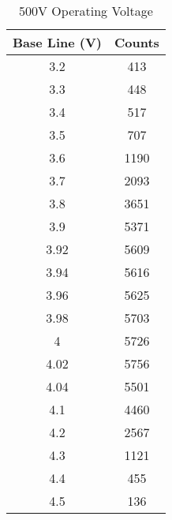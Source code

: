 \begin{table}[]
	\centering
	\begin{tabular}{|c|c|}
	\hline
	\textbf{Base Line (V)} & \textbf{Counts} \\ \hline
	3.2  & 413  \\ \hline
	3.3  & 448  \\ \hline
	3.4  & 517  \\ \hline
	3.5  & 707  \\ \hline
	3.6  & 1190 \\ \hline
	3.7  & 2093 \\ \hline
	3.8  & 3651 \\ \hline
	3.9  & 5371 \\ \hline
	3.92 & 5609 \\ \hline
	3.94 & 5616 \\ \hline
	3.96 & 5625 \\ \hline
	3.98 & 5703 \\ \hline
	4    & 5726 \\ \hline
	4.02 & 5756 \\ \hline
	4.04 & 5501 \\ \hline
	4.1  & 4460 \\ \hline
	4.2  & 2567 \\ \hline
	4.3  & 1121 \\ \hline
	4.4  & 455  \\ \hline
	4.5  & 136  \\ \hline
	\end{tabular}
	\caption{500V Operating Voltage}
	\label{tab:sca500}
\end{table}